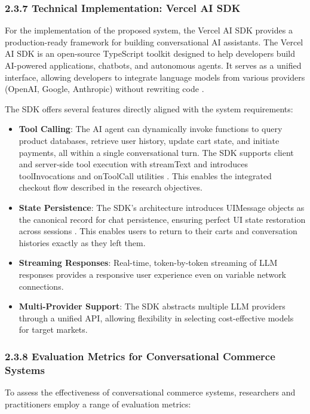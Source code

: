 \documentclass[12pt,a4paper]{article}
\begin{document}
\subsubsection{2.3.7 Technical Implementation: Vercel AI SDK}

For the implementation of the proposed system, the Vercel AI SDK provides a production-ready framework for building conversational AI assistants. The Vercel AI SDK is an open-source TypeScript toolkit designed to help developers build AI-powered applications, chatbots, and autonomous agents. It serves as a unified interface, allowing developers to integrate language models from various providers (OpenAI, Google, Anthropic) without rewriting code \citep{vercel2025}.

The SDK offers several features directly aligned with the system requirements:

\begin{itemize}
    \item \textbf{Tool Calling}: The AI agent can dynamically invoke functions to query product databases, retrieve user history, update cart state, and initiate payments, all within a single conversational turn. The SDK supports client and server-side tool execution with streamText and introduces toolInvocations and onToolCall utilities \citep{vercel2025}. This enables the integrated checkout flow described in the research objectives.
    \item \textbf{State Persistence}: The SDK's architecture introduces UIMessage objects as the canonical record for chat persistence, ensuring perfect UI state restoration across sessions \citep{vercel2025}. This enables users to return to their carts and conversation histories exactly as they left them.
    \item \textbf{Streaming Responses}: Real-time, token-by-token streaming of LLM responses provides a responsive user experience even on variable network connections.
    \item \textbf{Multi-Provider Support}: The SDK abstracts multiple LLM providers through a unified API, allowing flexibility in selecting cost-effective models for target markets.
\end{itemize}

\subsubsection{2.3.8 Evaluation Metrics for Conversational Commerce Systems}

To assess the effectiveness of conversational commerce systems, researchers and practitioners employ a range of evaluation metrics:
\end{document}
